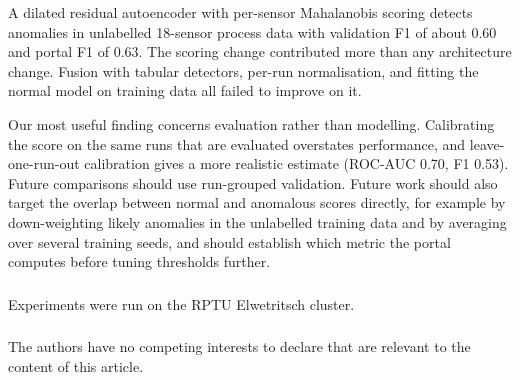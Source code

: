 \documentclass[runningheads]{llncs}
\begin{document}
A dilated residual autoencoder with per-sensor Mahalanobis scoring detects anomalies in unlabelled 18-sensor process data with validation F1 of about 0.60 and portal F1 of 0.63. The scoring change contributed more than any architecture change. Fusion with tabular detectors, per-run normalisation, and fitting the normal model on training data all failed to improve on it.

Our most useful finding concerns evaluation rather than modelling. Calibrating the score on the same runs that are evaluated overstates performance, and leave-one-run-out calibration gives a more realistic estimate (ROC-AUC 0.70, F1 0.53). Future comparisons should use run-grouped validation. Future work should also target the overlap between normal and anomalous scores directly, for example by down-weighting likely anomalies in the unlabelled training data and by averaging over several training seeds, and should establish which metric the portal computes before tuning thresholds further.

\begin{credits}
\subsubsection{\ackname}
Experiments were run on the RPTU Elwetritsch cluster.

\subsubsection{\discintname}
The authors have no competing interests to declare that are relevant to the content of this article.
\end{credits}



\end{document}
